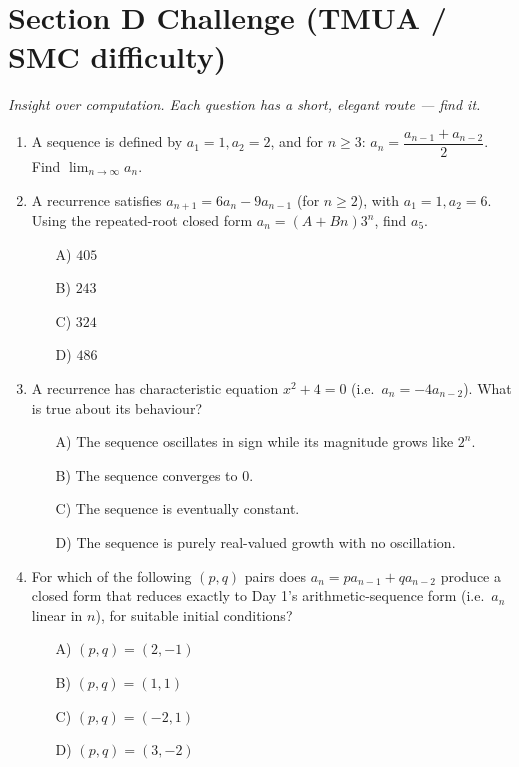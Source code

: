 \documentclass[11pt,a4paper]{article}
\begin{document}
\section*{Section D \quad Challenge \hfill{\normalfont\small(TMUA / SMC difficulty)}}

\noindent\textit{Insight over computation. Each question has a short, elegant route --- find it.}

\begin{enumerate}

\item A sequence is defined by $a_1=1,a_2=2$, and for $n\geq3$: $a_n=\dfrac{a_{n-1}+a_{n-2}}2$. Find $\displaystyle\lim_{n\to\infty}a_n$.

\item A recurrence satisfies $a_{n+1}=6a_n-9a_{n-1}$ (for $n\geq2$), with $a_1=1,a_2=6$. Using the repeated-root closed form $a_n=(A+Bn)3^n$, find $a_5$.
\begin{itemize}
\item[A)] $405$
\item[B)] $243$
\item[C)] $324$
\item[D)] $486$
\end{itemize}

\item A recurrence has characteristic equation $x^2+4=0$ (i.e.\ $a_n=-4a_{n-2}$). What is true about its behaviour?
\begin{itemize}
\item[A)] The sequence oscillates in sign while its magnitude grows like $2^n$.
\item[B)] The sequence converges to $0$.
\item[C)] The sequence is eventually constant.
\item[D)] The sequence is purely real-valued growth with no oscillation.
\end{itemize}

\item For which of the following $(p,q)$ pairs does $a_n=pa_{n-1}+qa_{n-2}$ produce a closed form that reduces exactly to Day 1's arithmetic-sequence form (i.e.\ $a_n$ linear in $n$), for suitable initial conditions?
\begin{itemize}
\item[A)] $(p,q)=(2,-1)$
\item[B)] $(p,q)=(1,1)$
\item[C)] $(p,q)=(-2,1)$
\item[D)] $(p,q)=(3,-2)$
\end{itemize}


\end{enumerate}
\end{document}
